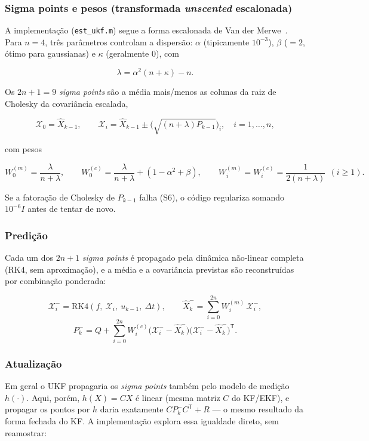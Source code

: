 \documentclass[brazil, 12pt]{article}
\begin{document}
\subsubsection{Sigma points e pesos (transformada \emph{unscented} escalonada)}

A implementação (\texttt{est\_ukf.m}) segue a forma escalonada de Van der
Merwe~\cite{wan2000}. Para $n=4$, três parâmetros controlam a dispersão:
$\alpha$ (tipicamente $10^{-3}$), $\beta$ ($=2$, ótimo para gaussianas) e
$\kappa$ (geralmente $0$), com

\[
\lambda = \alpha^2(n+\kappa) - n.
\]

Os $2n+1=9$ \emph{sigma points} são a média mais/menos as colunas da raiz de
Cholesky da covariância escalada,

\[
\mathcal{X}_0 = \hat X_{k-1},
\qquad
\mathcal{X}_i = \hat X_{k-1} \pm \Big(\sqrt{(n+\lambda)P_{k-1}}\Big)_i,
\quad i=1,\dots,n,
\]

com pesos

\[
W_0^{(m)} = \frac{\lambda}{n+\lambda}, \qquad
W_0^{(c)} = \frac{\lambda}{n+\lambda} + (1-\alpha^2+\beta), \qquad
W_i^{(m)} = W_i^{(c)} = \frac{1}{2(n+\lambda)}\ \ (i\geq1).
\]

Se a fatoração de Cholesky de $P_{k-1}$ falha (S6), o código regulariza
somando $10^{-6}I$ antes de tentar de novo.

\subsubsection{Predição}

Cada um dos $2n+1$ \emph{sigma points} é propagado pela dinâmica não-linear
completa (RK4, sem aproximação), e a média e a covariância previstas são
reconstruídas por combinação ponderada:

\[
\mathcal{X}_i^{-} = \mathrm{RK4}(f,\ \mathcal{X}_i,\ u_{k-1},\ \Delta t),
\qquad
\hat X_k^{-} = \sum_{i=0}^{2n} W_i^{(m)}\,\mathcal{X}_i^{-},
\]
\[
P_k^{-} = Q + \sum_{i=0}^{2n} W_i^{(c)}\big(\mathcal{X}_i^{-}-\hat X_k^{-}\big)\big(\mathcal{X}_i^{-}-\hat X_k^{-}\big)^{\mathsf T}.
\]

\subsubsection{Atualização}

Em geral o UKF propagaria os \emph{sigma points} também pelo modelo de medição
$h(\cdot)$. Aqui, porém, $h(X)=CX$ é linear (mesma matriz $C$ do KF/EKF), e
propagar os pontos por $h$ daria exatamente $C P_k^{-} C^{\mathsf T}+R$ --- o
mesmo resultado da forma fechada do KF. A implementação explora essa
igualdade direto, sem reamostrar:
\end{document}
